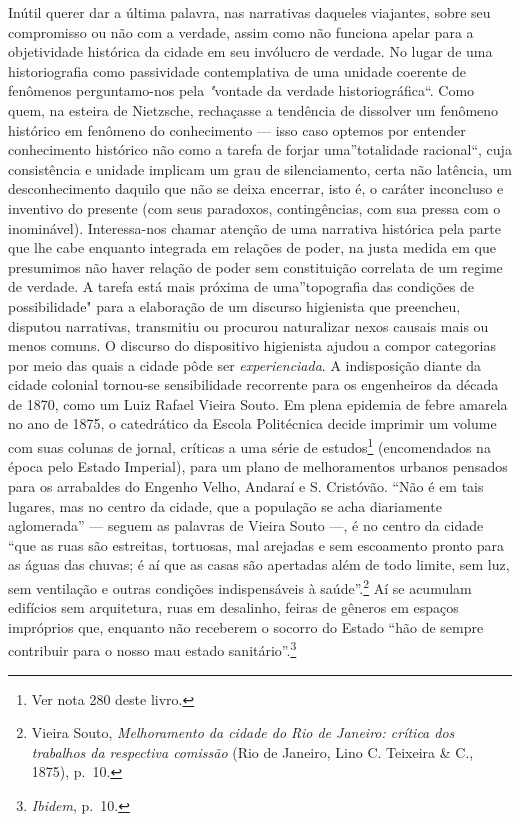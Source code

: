 Inútil querer dar a última palavra, nas narrativas daqueles viajantes,
sobre seu compromisso ou não com a verdade, assim como não funciona
apelar para a objetividade histórica da cidade em seu invólucro de
verdade. No lugar de uma historiografia como passividade contemplativa
de uma unidade coerente de fenômenos perguntamo-nos pela \textit{"}vontade
da verdade historiográfica``. Como quem, na esteira de Nietzsche,
rechaçasse a tendência de dissolver um fenômeno histórico em fenômeno do
conhecimento --- isso caso optemos por entender conhecimento histórico
não como a tarefa de forjar uma''totalidade racional``, cuja
consistência e unidade implicam um grau de silenciamento, certa não
latência, um desconhecimento daquilo que não se deixa encerrar, isto é,
o caráter inconcluso e inventivo do presente (com seus paradoxos,
contingências, com sua pressa com o inominável). Interessa-nos chamar
atenção de uma narrativa histórica pela parte que lhe cabe enquanto
integrada em relações de poder, na justa medida em que presumimos não
haver relação de poder sem constituição correlata de um regime de
verdade. A tarefa está mais próxima de uma''topografia das condições de
possibilidade" para a elaboração de um discurso higienista que
preencheu, disputou narrativas, transmitiu ou procurou naturalizar nexos
causais mais ou menos comuns. O discurso do dispositivo higienista
ajudou a compor categorias por meio das quais a cidade pôde ser
\textit{experienciada}. A indisposição diante da cidade colonial tornou-se
sensibilidade recorrente para os engenheiros da década de 1870, como um
Luiz Rafael Vieira Souto. Em plena epidemia de febre amarela no ano de
1875, o catedrático da Escola Politécnica decide imprimir um volume com
suas colunas de jornal, críticas a uma série de estudos\footnote{Ver
  nota 280 deste livro.} (encomendados na época pelo Estado Imperial),
para um plano de melhoramentos urbanos pensados para os arrabaldes do
Engenho Velho, Andaraí e S. Cristóvão. ``Não é em tais lugares, mas no
centro da cidade, que a população se acha diariamente aglomerada'' ---
seguem as palavras de Vieira Souto ---, é no centro da cidade ``que as
ruas são estreitas, tortuosas, mal arejadas e sem escoamento pronto para
as águas das chuvas; é aí que as casas são apertadas além de todo
limite, sem luz, sem ventilação e outras condições indispensáveis à
saúde''.\footnote{Vieira Souto, \textit{Melhoramento da cidade do Rio de
  Janeiro: crítica dos trabalhos da respectiva comissão} (Rio de
  Janeiro, Lino C. Teixeira \& C., 1875), p.~10.} Aí se acumulam
edifícios sem arquitetura, ruas em desalinho, feiras de gêneros em
espaços impróprios que, enquanto não receberem o socorro do Estado ``hão
de sempre contribuir para o nosso mau estado sanitário''.\footnote{\textit{Ibidem},
  p.~10.}

